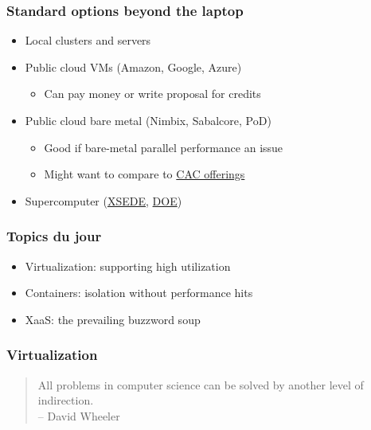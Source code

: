 \documentclass{beamer}
\begin{document}
\begin{frame}
  \frametitle{Standard options beyond the laptop}

  \begin{itemize}
  \item Local clusters and servers
  \item Public cloud VMs (Amazon, Google, Azure)
    \begin{itemize}
    \item Can pay money or write proposal for credits
    \end{itemize}
  \item Public cloud bare metal (Nimbix, Sabalcore, PoD)
    \begin{itemize}
    \item Good if bare-metal parallel performance an issue
    \item Might want to compare to
      \href{https://www.cac.cornell.edu/}{CAC offerings}
    \end{itemize}
  \item Supercomputer (\href{https://www.xsede.org/}{XSEDE},
    \href{http://science.energy.gov/ascr/facilities/accessing-ascr-facilities/}{DOE})
  \end{itemize}
\end{frame}


\begin{frame}
  \frametitle{Topics du jour}

  \begin{itemize}
  \item Virtualization: supporting high utilization
  \item Containers: isolation without performance hits
  \item XaaS: the prevailing buzzword soup
  \end{itemize}
\end{frame}


\begin{frame}
  \frametitle{Virtualization}

  \begin{quote}
    All problems in computer science can be solved by another level of
    indirection. \\
    \hfill -- David Wheeler
  \end{quote}
\end{frame}
\end{document}
